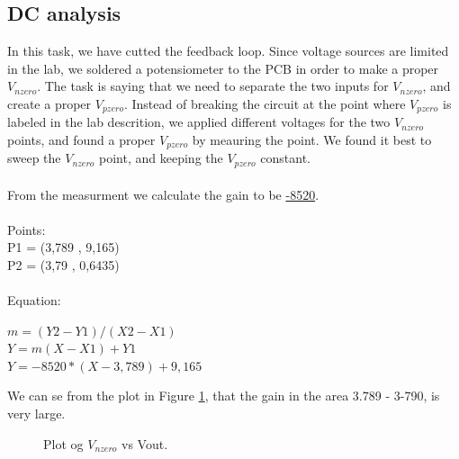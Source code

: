 \documentclass[a4paper,english,11pt]{article}
\begin{document}
\subsection*{DC analysis}
In this task, we have cutted the feedback loop. Since voltage sources are limited in the lab, we soldered a potensiometer to the PCB
in order to make a proper $V_{nzero}$. The task is saying that we need to separate the two inputs for $V_{nzero}$, and create a proper $V_{pzero}$.
Instead of breaking the circuit at the point where $V_{pzero}$ is labeled in the lab descrition, we applied different voltages for the two 
$V_{nzero}$ points, and found a proper $V_{pzero}$ by meauring the point. We found it best to sweep the $V_{nzero}$ point, and keeping the $V_{pzero}$ constant.
\\
\\

From the measurment we calculate the gain to be \underline{-8520}.\\
\\
Points:\\
P1 = (3,789 , 9,165)\\
P2 = (3,79 , 0,6435)\\
\\
Equation:
\begin{center}
$m = (Y2 - Y1) / (X2 - X1)$\\
$Y = m(X - X1) + Y1$\\
$Y = -8520 * (X - 3,789) + 9,165$
\end{center}
We can se from the plot in Figure \ref{fig:vnzero:vout}, that the gain in the area 3.789 - 3-790, is very large.  

\begin{figure}[!htbp]
 \centering
  \caption{Plot og $V_{nzero}$ vs Vout.}
  \label{fig:vnzero:vout}	
\end{figure}
\end{document}
